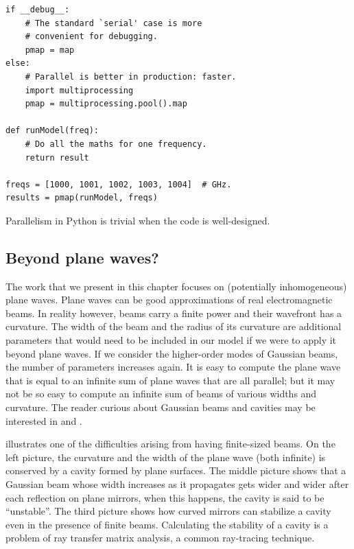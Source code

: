 \begin{algorithm}
\lstset{language=Python}
\begin{lstlisting}   
if __debug__:
    # The standard `serial' case is more
    # convenient for debugging.
    pmap = map
else:
    # Parallel is better in production: faster.
    import multiprocessing
    pmap = multiprocessing.pool().map

def runModel(freq):
    # Do all the maths for one frequency.
    return result

freqs = [1000, 1001, 1002, 1003, 1004]  # GHz.
results = pmap(runModel, freqs)    
\end{lstlisting}
\caption{Parallelism in Python is trivial when the code is well-designed.}
\label{algo:para_python}
\end{algorithm}



\clearpage
\subsection{Beyond plane waves?}
The work that we present in this chapter focuses on (potentially inhomogeneous) plane waves.
Plane waves can be good approximations of real electromagnetic beams.
In reality however, beams carry a finite power and their wavefront has a curvature.
The width of the beam and the radius of its curvature are additional parameters that would need to be included in our model if we were to apply it beyond plane waves.
If we consider the higher-order modes of Gaussian beams, the number of parameters increases again.
It is easy to compute the plane wave that is equal to an infinite sum of plane waves that are all parallel;
but it may not be so easy to compute an infinite sum of beams of various widths and curvature.
The reader curious about Gaussian beams and cavities may be interested in
\textcite{goldsmith1998quasioptical}
and
\textcite{siegman1986lasers}.

 illustrates one of the difficulties arising from having finite-sized beams.
On the left picture, the curvature and the width of the plane wave (both infinite) is conserved by a cavity formed by plane surfaces.
The middle picture shows that a Gaussian beam whose width increases as it propagates gets wider and wider after each reflection on plane mirrors, when this happens, the cavity is said to be ``unstable''.
The third picture shows how curved mirrors can stabilize a cavity even in the presence of finite beams.
Calculating the stability of a cavity is a problem of ray transfer matrix analysis, a common ray-tracing technique.

